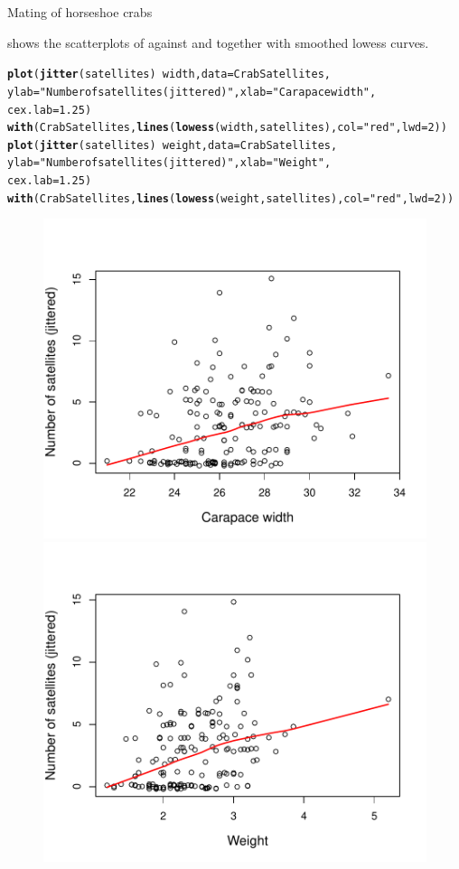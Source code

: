 \documentclass[11pt]{book}\usepackage[]{graphicx}\usepackage[]{color}
\makeatletter
\newcommand{\hlnum}[1]{\textcolor[rgb]{0.686,0.059,0.569}{#1}}%
\newcommand{\hlstr}[1]{\textcolor[rgb]{0.192,0.494,0.8}{#1}}%
\newcommand{\hlopt}[1]{\textcolor[rgb]{0,0,0}{#1}}%
\newcommand{\hlstd}[1]{\textcolor[rgb]{0.345,0.345,0.345}{#1}}%
\newcommand{\hlkwc}[1]{\textcolor[rgb]{0.333,0.667,0.333}{#1}}%
\newcommand{\hlkwd}[1]{\textcolor[rgb]{0.737,0.353,0.396}{\textbf{#1}}}%
\newenvironment{kframe}{%
 \def\at@end@of@kframe{}%
 \ifinner\ifhmode%
  \def\at@end@of@kframe{\end{minipage}}%
  \begin{minipage}{\columnwidth}%
 \fi\fi%
 \def\FrameCommand##1{\hskip\@totalleftmargin \hskip-\fboxsep
 \colorbox{shadecolor}{##1}\hskip-\fboxsep
     \hskip-\linewidth \hskip-\@totalleftmargin \hskip\columnwidth}%
 \MakeFramed {\advance\hsize-\width
   \@totalleftmargin\z@ \linewidth\hsize
   \@setminipage}}%
 {\par\unskip\endMakeFramed%
 \at@end@of@kframe}
\newenvironment{knitrout}{}{} %
\renewenvironment{knitrout}{\small\renewcommand{\baselinestretch}{.85}}{} %
\makeatother
\begin{document}
\begin{Example}[crabs1]{Mating of horseshoe crabs}
\begin{knitrout}
\end{knitrout}

 shows the scatterplots of  against  and 
together with smoothed lowess curves.
\begin{knitrout}
\color{fgcolor}\begin{kframe}
\begin{alltt}
\hlkwd{plot}\hlstd{(}\hlkwd{jitter}\hlstd{(satellites)} \hlopt{~} \hlstd{width,} \hlkwc{data}\hlstd{=CrabSatellites,}
  \hlkwc{ylab}\hlstd{=}\hlstr{"Number of satellites (jittered)"}\hlstd{,} \hlkwc{xlab}\hlstd{=}\hlstr{"Carapace width"}\hlstd{,}
  \hlkwc{cex.lab}\hlstd{=}\hlnum{1.25}\hlstd{)}
\hlkwd{with}\hlstd{(CrabSatellites,} \hlkwd{lines}\hlstd{(}\hlkwd{lowess}\hlstd{(width, satellites),} \hlkwc{col}\hlstd{=}\hlstr{"red"}\hlstd{,} \hlkwc{lwd}\hlstd{=}\hlnum{2}\hlstd{))}
\hlkwd{plot}\hlstd{(}\hlkwd{jitter}\hlstd{(satellites)} \hlopt{~} \hlstd{weight,} \hlkwc{data}\hlstd{=CrabSatellites,}
  \hlkwc{ylab}\hlstd{=}\hlstr{"Number of satellites (jittered)"}\hlstd{,} \hlkwc{xlab}\hlstd{=}\hlstr{"Weight"}\hlstd{,}
  \hlkwc{cex.lab}\hlstd{=}\hlnum{1.25}\hlstd{)}
\hlkwd{with}\hlstd{(CrabSatellites,} \hlkwd{lines}\hlstd{(}\hlkwd{lowess}\hlstd{(weight, satellites),} \hlkwc{col}\hlstd{=}\hlstr{"red"}\hlstd{,} \hlkwc{lwd}\hlstd{=}\hlnum{2}\hlstd{))}
\end{alltt}
\end{kframe}\begin{figure}[!htbp]


\centerline{\includegraphics[width=.49\textwidth]{ch09/fig/crabs1-scats-1} 
\includegraphics[width=.49\textwidth]{ch09/fig/crabs1-scats-2} }


\end{figure}
\end{knitrout}
\end{Example}
\end{document}
